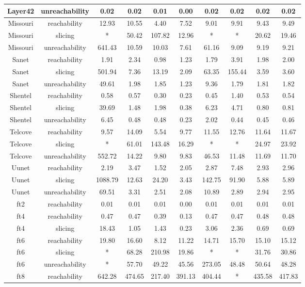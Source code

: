 \documentclass{article}
\begin{document}
\begin{center}
{\begin{tabular}{ |c|c|c|c|c|c|c|c|c|c|}
Layer42 & unreachability & 0.02 & 0.02 & 0.01 & 0.00 & 0.02 & 0.02 & 0.02 & 0.02 \\\hline
Missouri & reachability & 12.93 & 10.55 & 4.40 & 7.52 & 9.01 & 9.91 & 9.43 & 9.49 \\\hline
Missouri & slicing & * & 50.42 & 107.82 & 12.96 & * & * & 20.62 & 19.46 \\\hline
Missouri & unreachability & 641.43 & 10.59 & 10.03 & 7.61 & 61.16 & 9.09 & 9.19 & 9.21 \\\hline
Sanet & reachability & 1.91 & 2.34 & 0.98 & 1.23 & 1.79 & 3.91 & 1.98 & 2.00 \\\hline
Sanet & slicing & 501.94 & 7.36 & 13.19 & 2.09 & 63.35 & 155.44 & 3.59 & 3.60 \\\hline
Sanet & unreachability & 49.61 & 1.98 & 1.85 & 1.23 & 9.36 & 1.79 & 1.81 & 1.82 \\\hline
Shentel & reachability & 0.58 & 0.57 & 0.30 & 0.23 & 0.45 & 1.40 & 0.53 & 0.54 \\\hline
Shentel & slicing & 39.69 & 1.48 & 1.98 & 0.38 & 6.23 & 4.71 & 0.80 & 0.81 \\\hline
Shentel & unreachability & 6.45 & 0.48 & 0.48 & 0.23 & 2.02 & 0.44 & 0.45 & 0.46 \\\hline
Telcove & reachability & 9.57 & 14.09 & 5.54 & 9.77 & 11.55 & 12.76 & 11.64 & 11.67 \\\hline
Telcove & slicing & * & 61.01 & 143.48 & 16.29 & * & * & 24.97 & 23.92 \\\hline
Telcove & unreachability & 552.72 & 14.22 & 9.80 & 9.83 & 46.53 & 11.48 & 11.69 & 11.70 \\\hline
Uunet & reachability & 2.19 & 3.47 & 1.52 & 2.05 & 2.87 & 7.48 & 2.93 & 2.96 \\\hline
Uunet & slicing & 1088.79 & 12.63 & 24.20 & 3.43 & 142.75 & 91.90 & 5.88 & 5.89 \\\hline
Uunet & unreachability & 69.51 & 3.31 & 2.51 & 2.08 & 10.89 & 2.89 & 2.94 & 2.95 \\\hline
ft2 & reachability & 0.01 & 0.01 & 0.01 & 0.00 & 0.01 & 0.01 & 0.01 & 0.01 \\\hline
ft4 & reachability & 0.47 & 0.47 & 0.39 & 0.13 & 0.47 & 0.47 & 0.48 & 0.48  \\\hline
ft4 & slicing & 18.43 & 1.05 & 1.43 & 0.23 & 3.06 & 2.36 & 0.69 & 0.69 \\\hline
ft6 & reachability & 19.80 & 16.60 & 8.12 & 11.22 & 14.71 & 15.70 & 15.10 & 15.12 \\\hline
ft6 & slicing & * & 68.28 & 210.98 & 19.86 & * & *  & 31.76 & 30.86 \\\hline
ft6 & unreachability & * & 57.70 & 49.22 & 45.56 & 273.05 & 48.48 & 50.64 & 48.28 \\\hline
ft8 & reachability & 642.28 & 474.65 & 217.40 & 391.13 & 404.44 & *  & 435.58 & 417.83 \\\hline
  \end{tabular}}
\end{center}
\end{document}
